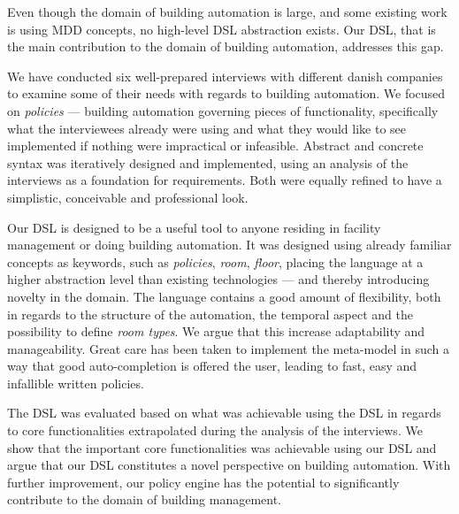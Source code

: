 Even though the domain of building automation is large, and some existing work is using MDD concepts, no high-level DSL abstraction exists. Our DSL, that is the main contribution to the domain of building automation, addresses this gap.

We have conducted six well-prepared interviews with different danish companies to examine some of their needs with regards to building automation. We focused on \textit{policies} --- building automation governing pieces of functionality, specifically what the interviewees already were using and what they would like to see implemented if nothing were impractical or infeasible. Abstract and concrete syntax was iteratively designed and implemented, using an analysis of the interviews as a foundation for requirements. Both were equally refined to have a simplistic, conceivable and professional look. 

Our DSL is designed to be a useful tool to anyone residing in facility management or doing building automation. It was designed using already familiar concepts as keywords, such as \textit{policies}, \textit{room}, \textit{floor}, placing the language at a higher abstraction level than existing technologies --- and thereby introducing novelty in the domain. The language contains a good amount of flexibility, both in regards to the structure of the automation, the temporal aspect and the possibility to define \textit{room types}. We argue that this increase adaptability and manageability. Great care has been taken to implement the meta-model in such a way that good auto-completion is offered the user, leading to fast, easy and infallible written policies. 

The DSL was evaluated based on what was achievable using the DSL in regards to core functionalities extrapolated during the analysis of the interviews. We show that the important core functionalities was achievable using our DSL and argue that our DSL constitutes a novel perspective on building automation. With further improvement, our policy engine has the potential to significantly contribute to the domain of building management.